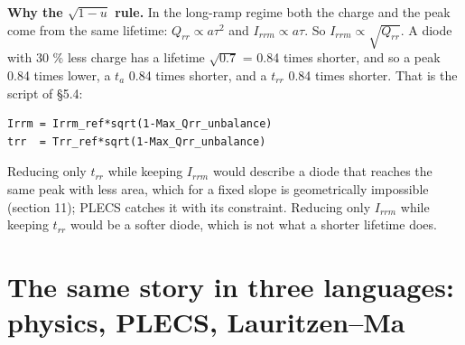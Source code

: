 \documentclass[11pt,a4paper,numbers=noenddot]{scrartcl}
\begin{document}
\begin{onehalfspace}
\textbf{Why the \(\sqrt{1-u}\) rule.} In the long-ramp regime both the charge and the peak come from the same lifetime: \(Q_{rr} \propto a\tau^2\) and \(I_{rrm} \propto a\tau\). So \(I_{rrm} \propto \sqrt{Q_{rr}}\). A diode with 30 \% less charge has a lifetime \(\sqrt{0.7}\) = 0.84 times shorter, and so a peak 0.84 times lower, a \(t_a\) 0.84 times shorter, and a \(t_{rr}\) 0.84 times shorter. That is the script of \S5.4:

{\small\singlespacing\begin{verbatim}
Irrm = Irrm_ref*sqrt(1-Max_Qrr_unbalance)
trr  = Trr_ref*sqrt(1-Max_Qrr_unbalance)
\end{verbatim}}

Reducing only \(t_{rr}\) while keeping \(I_{rrm}\) would describe a diode that reaches the same peak with less area, which for a fixed slope is geometrically impossible (section 11); PLECS catches it with its constraint. Reducing only \(I_{rrm}\) while keeping \(t_{rr}\) would be a softer diode, which is not what a shorter lifetime does.

\section{The same story in three languages: physics, PLECS, Lauritzen--Ma}\label{the-same-story-in-three-languages-physics-plecs-lauritzenma}


\end{onehalfspace}
\end{document}
